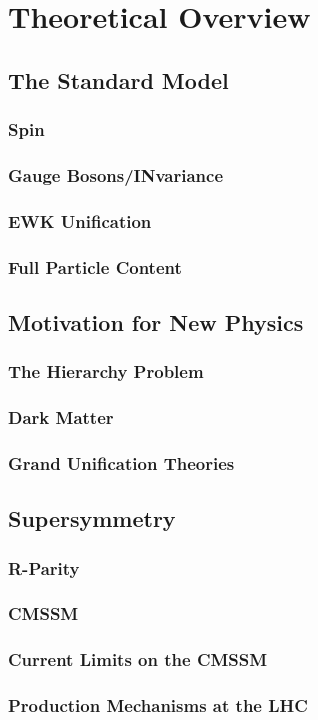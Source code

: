 \chapter{Theoretical Overview}

\section{The Standard Model}

\subsection{Spin}
\subsection{Gauge Bosons/INvariance}
\subsection{EWK Unification}
\subsection{Full Particle Content} 


\section{Motivation for New Physics}
	
\subsection{The Hierarchy Problem}
\subsection{Dark Matter}
\subsection{Grand Unification Theories}

\section{Supersymmetry}

\subsection{R-Parity}
\subsection{CMSSM}
\subsection{Current Limits on the CMSSM}
\subsection{Production Mechanisms at the LHC}



